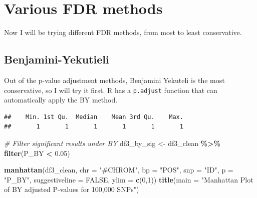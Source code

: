 \documentclass[
  12pt,
]{article}
\newenvironment{Shaded}{\begin{snugshade}}{\end{snugshade}}
\newcommand{\AttributeTok}[1]{\textcolor[rgb]{0.13,0.29,0.53}{#1}}
\newcommand{\CommentTok}[1]{\textcolor[rgb]{0.56,0.35,0.01}{\textit{#1}}}
\newcommand{\ConstantTok}[1]{\textcolor[rgb]{0.56,0.35,0.01}{#1}}
\newcommand{\DecValTok}[1]{\textcolor[rgb]{0.00,0.00,0.81}{#1}}
\newcommand{\FloatTok}[1]{\textcolor[rgb]{0.00,0.00,0.81}{#1}}
\newcommand{\FunctionTok}[1]{\textcolor[rgb]{0.13,0.29,0.53}{\textbf{#1}}}
\newcommand{\NormalTok}[1]{#1}
\newcommand{\OtherTok}[1]{\textcolor[rgb]{0.56,0.35,0.01}{#1}}
\newcommand{\SpecialCharTok}[1]{\textcolor[rgb]{0.81,0.36,0.00}{\textbf{#1}}}
\newcommand{\StringTok}[1]{\textcolor[rgb]{0.31,0.60,0.02}{#1}}
\begin{document}
\section{Various FDR methods}\label{various-fdr-methods}

Now I will be trying different FDR methods, from most to least
conservative.

\subsection{Benjamini-Yekutieli}\label{benjamini-yekutieli}

Out of the p-value adjustment methods, Benjamini Yekuteli is the most
conservative, so I will try it first. R has a \texttt{p.adjust} function
that can automatically apply the BY method.

\begin{Shaded}
\end{Shaded}

\begin{verbatim}
##    Min. 1st Qu.  Median    Mean 3rd Qu.    Max. 
##       1       1       1       1       1       1
\end{verbatim}

\begin{Shaded}
\begin{Highlighting}[]
\CommentTok{\# Filter significant results under BY }
\NormalTok{df3\_by\_sig }\OtherTok{\textless{}{-}}\NormalTok{ df3\_clean }\SpecialCharTok{\%\textgreater{}\%} \FunctionTok{filter}\NormalTok{(P\_BY }\SpecialCharTok{\textless{}} \FloatTok{0.05}\NormalTok{)}

\FunctionTok{manhattan}\NormalTok{(df3\_clean, }\AttributeTok{chr =} \StringTok{"\#CHROM"}\NormalTok{, }\AttributeTok{bp =} \StringTok{"POS"}\NormalTok{, }\AttributeTok{snp =} \StringTok{"ID"}\NormalTok{, }\AttributeTok{p =} \StringTok{"P\_BY"}\NormalTok{, }\AttributeTok{suggestiveline =} \ConstantTok{FALSE}\NormalTok{, }\AttributeTok{ylim =} \FunctionTok{c}\NormalTok{(}\DecValTok{0}\NormalTok{,}\DecValTok{1}\NormalTok{)) }
\FunctionTok{title}\NormalTok{(}\AttributeTok{main =} \StringTok{"Manhattan Plot of BY adjusted P{-}values for 100,000 SNPs"}\NormalTok{)}
\end{Highlighting}
\end{Shaded}
\end{document}
